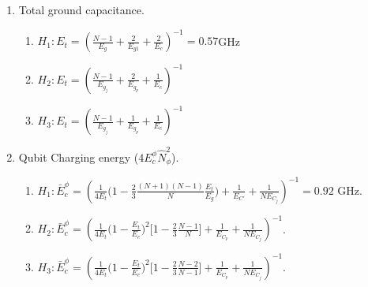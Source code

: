 \documentclass[%
reprint,
superscriptaddress,
 amsmath,amssymb,
 aps,
 prx,
longbibliography,
floatfix,
]{revtex4-2}
\begin{document}
\begin{enumerate}
    \item Total ground capacitance.
    \begin{enumerate}
        \item $H_1: E_t=(\frac{N-1}{E_g}+\frac{2}{E_{g1}}+\frac{2}{E_c})^{-1}=0.57 $GHz
    \item $H_2: E_t=(\frac{N-1}{E_{g_j}}+\frac{2}{E_{g_p}}+\frac{1}{E_c})^{-1}$
    \item $H_3: E_t=(\frac{N-1}{E_{g_j}}+\frac{1}{E_{g_p}}+\frac{1}{E_c})^{-1}$
    \end{enumerate}
\item Qubit Charging energy ($4E_c^\phi \hat N_{\phi}^2$). 
    \begin{enumerate}
    \item $H_1:\bar{E}_c^\phi=(\frac{1}{4E_t}\Big(1-\frac{2}{3}\frac{(N+1)(N-1)}{N}\frac{E_t}{E_g}\Big)+\frac{1}{E_{C'}}+\frac{1}{NE_{C_j}})^{-1}=0.92$ GHz.
    \item $H_2: \bar{E}_c^\phi=(\frac{1}{4E_t}\Big(1-\frac{E_t}{E_c}\Big)^2\Big[1-\frac{2}{3}\frac{N-1}{N}\Big]+\frac{1}{E_{C_p}}+\frac{1}{NE_{C_j}})^{-1}$. 
    \item  $H_3: \bar{E}_c^\phi=(\frac{1}{4E_t}\Big(1-\frac{E_t}{E_c}\Big)^2\Big[1-\frac{2}{3}\frac{N-2}{N-1}\Big]+\frac{1}{E_{C_p}}+\frac{1}{NE_{C_j}})^{-1}$.
    \end{enumerate}
    

\end{enumerate}
\end{document}
